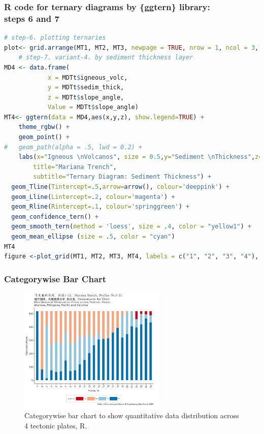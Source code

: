 \documentclass[pdflatex,compress,10pt,
	xcolor={dvipsnames,dvipsnames,svgnames,x11names,table},
	hyperref={colorlinks = true,breaklinks = true, urlcolor = NavyBlue, breaklinks = true}]{beamer}
\begin{document}
\begin{frame}[fragile]\frametitle{R code for ternary diagrams by \{ggtern\} library: \\steps 6 and 7}
\begin{lstlisting}[language=R]
	# step-6. plotting ternaries
plot<- grid.arrange(MT1, MT2, MT3, newpage = TRUE, nrow = 1, ncol = 3, top="Mariana Trench")
	# step-7. variant-4. by sediment thickness layer
MD4 <- data.frame(
			x = MDTt$igneous_volc,
			y = MDTt$sedim_thick,
			z = MDTt$slope_angle,
			Value = MDTt$slope_angle)
MT4<- ggtern(data = MD4,aes(x,y,z), show.legend=TRUE) + 
	theme_rgbw() +
	geom_point() + 
#	geom_path(alpha = .5, lwd = 0.2) + 
	labs(x="Igneous \nVolcanos", size = 0.5,y="Sediment \nThickness",z="Slope \nAngle",
  		title="Mariana Trench",
  		subtitle="Ternary Diagram: Sediment Thickness") +
  geom_Tline(Tintercept=.5,arrow=arrow(), colour='deeppink') +
  geom_Lline(Lintercept=.2, colour='magenta') +
  geom_Rline(Rintercept=.1, colour='springgreen') +
  geom_confidence_tern() + 
  geom_smooth_tern(method = 'loess', size = .4, color = "yellow1") +
  geom_mean_ellipse (size = .5, color = "cyan")
MT4
figure <-plot_grid(MT1, MT2, MT3, MT4, labels = c("1", "2", "3", "4"), ncol = 2, nrow = 2)
\end{lstlisting}
\end{frame}

\begin{frame}\frametitle{Categorywise Bar Chart}
\begin{figure}[H]
	\centering
		\includegraphics[width=7cm]{Fig-3-6.jpg}\caption{Categorywise bar chart to show quantitative data distribution across 4 tectonic plates, R.}
\end{figure}		
\end{frame}
\end{document}
